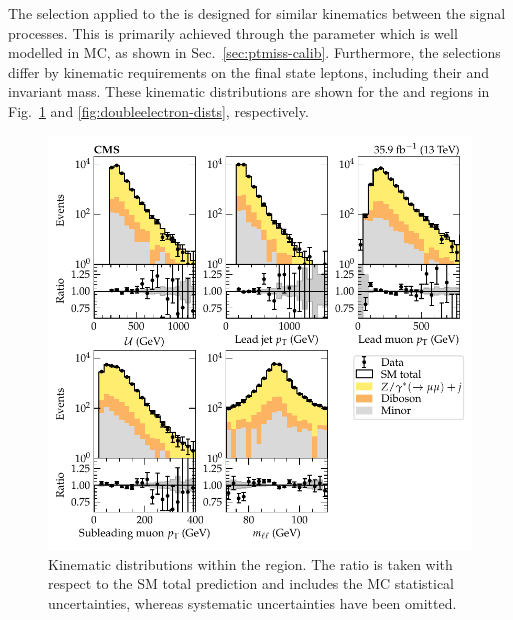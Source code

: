 The selection applied to the \diellplusjets is designed for similar kinematics between the signal processes. This is primarily achieved through the \recoil parameter which is well modelled in MC, as shown in Sec.~\ref{sec:ptmiss-calib}. Furthermore, the selections differ by kinematic requirements on the final state leptons, including their \pt and invariant mass. These kinematic distributions are shown for the \dimuplusjets and \dieleplusjets regions in Fig.~\ref{fig:doublemuon-dists} and \ref{fig:doubleelectron-dists}, respectively.
%
\begin{figure}[htb]
    \centering
    \includegraphics{chapters/043_results/images/doublemuon_dists.pdf}
    \caption[Dimuon kinematics.]{
        Kinematic distributions within the \dimuplusjets region. The ratio is taken with respect to the SM total prediction and includes the MC statistical uncertainties, whereas systematic uncertainties have been omitted.
    }
    \label{fig:doublemuon-dists}
\end{figure}
%
